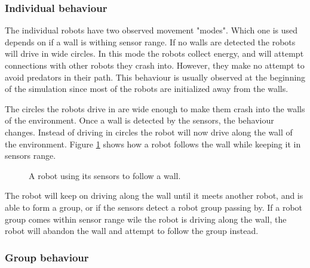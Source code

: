 \subsubsection{Individual behaviour}
\label{sec:invdividual_behaviour}
The individual robots have two observed movement "modes".
Which one is used depends on if a wall is withing sensor range.
If no walls are detected the robots will drive in wide circles.
In this mode the robots collect energy, and will attempt connections with other robots they crash into.
However, they make no attempt to avoid predators in their path.
This behaviour is usually observed at the beginning of the simulation since most of the robots are initialized away from the walls.


The circles the robots drive in are wide enough to make them crash into the walls of the environment.
Once a wall is detected by the sensors, the behaviour changes.
Instead of driving in circles the robot will now drive along the wall of the environment.
Figure \ref{fig:individual-wall-drive} shows how a robot follows the wall while keeping it in sensors range.

\begin{figure}[H]	
	\centering
	\caption{A robot using its sensors to follow a wall.}
	\label{fig:individual-wall-drive}
\end{figure}


The robot will keep on driving along the wall until it meets another robot, and is able to form a group, or if the sensors detect a robot group passing by.
If a robot group comes within sensor range wile the robot is driving along the wall, the robot will abandon the wall and attempt to follow the group instead.

\subsubsection{Group behaviour}


